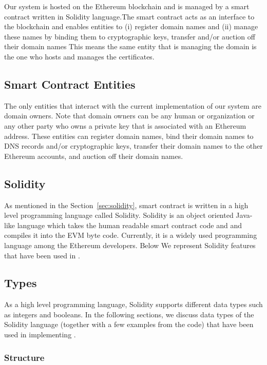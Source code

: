 Our system is hosted on the Ethereum blockchain and is managed by a smart contract written in Solidity language.The smart contract acts as an interface to the blockchain and enables entities to (i) register domain names and (ii) manage these names by binding them to cryptographic keys, transfer and/or auction off their domain names \etc This means the same entity that is managing the domain is the one who hosts and manages the certificates. 

\subsection{\Ghazalstar Smart Contract Entities}

The only entities that interact with the current implementation of our system are domain owners. Note that domain owners can be any human or organization or any other party who owns a private key that is associated with an Ethereum address. These entities can register domain names, bind their domain names to DNS records and/or cryptographic keys, transfer their domain names to the other Ethereum accounts, and auction off their domain names.
\subsection{Solidity}

As mentioned in the Section~\ref{sec:solidity}, \Ghazalstar smart contract is written in a high level programming language called Solidity. Solidity is an object oriented Java-like language which takes the human readable smart contract code and and compiles it into the EVM byte code. Currently, it is a widely used programming language among the Ethereum developers. Below We represent Solidity features that have been used in \Ghazalstar.
\subsection{Types}

As a high level programming language, Solidity supports different data types such as integers and  booleans. In the following sections, we discuss data types of the Solidity language (together with a few examples from the code) that have been used in implementing \Ghazalstar.
\subsubsection*{Structure}

